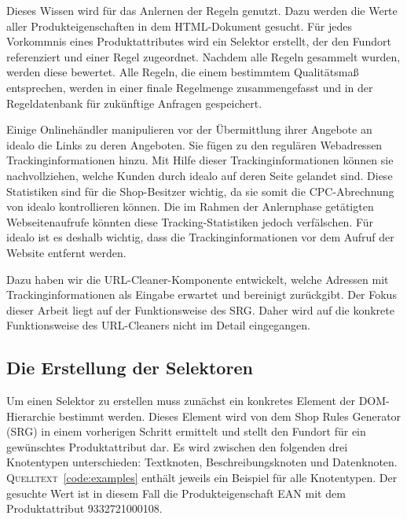 Dieses Wissen wird für das Anlernen der Regeln genutzt.
Dazu werden die Werte aller Produkteigenschaften in dem HTML-Dokument gesucht.
Für jedes Vorkommnis eines Produktattributes wird ein Selektor erstellt, der den Fundort referenziert und einer Regel
zugeordnet.
Nachdem alle Regeln gesammelt wurden, werden diese bewertet.
Alle Regeln, die einem bestimmtem Qualitätsmaß entsprechen, werden in einer finale Regelmenge zusammengefasst und in
der Regeldatenbank für zukünftige Anfragen gespeichert.

Einige Onlinehändler manipulieren vor der Übermittlung ihrer Angebote an idealo die Links zu deren Angeboten.
Sie fügen zu den regulären Webadressen Trackinginformationen hinzu.
Mit Hilfe dieser Trackinginformationen können sie nachvollziehen, welche Kunden durch idealo auf deren Seite gelandet
sind.
Diese Statistiken sind für die Shop-Besitzer wichtig, da sie somit die CPC-Abrechnung von idealo kontrollieren
können.
Die im Rahmen der Anlernphase getätigten Webseitenaufrufe könnten diese Tracking-Statistiken jedoch verfälschen.
Für idealo ist es deshalb wichtig, dass die Trackinginformationen vor dem Aufruf der Website entfernt werden.

Dazu haben wir die URL-Cleaner-Komponente entwickelt, welche Adressen mit Trackinginformationen als Eingabe erwartet und
bereinigt zurückgibt.
Der Fokus dieser Arbeit liegt auf der Funktionsweise des SRG.
Daher wird auf die konkrete Funktionsweise des URL-Cleaners nicht im Detail eingegangen.

\subsection{Die Erstellung der Selektoren}
\label{subsec:erstellen-von-selektoren}

Um einen Selektor zu erstellen muss zunächst ein konkretes Element der DOM-Hierarchie bestimmt werden.
Dieses Element wird von dem Shop Rules Generator (SRG) in einem vorherigen Schritt ermittelt und stellt den Fundort für
ein gewünschtes Produktattribut dar.
Es wird zwischen den folgenden drei Knotentypen unterschieden: Textknoten, Beschreibungsknoten und Datenknoten.
\textsc{Quelltext}~\ref{code:examples} enthält jeweils ein Beispiel für alle Knotentypen.
Der gesuchte Wert ist in diesem Fall die Produkteigenschaft EAN mit dem Produktattribut 9332721000108.

